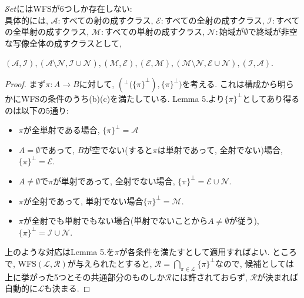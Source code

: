 \documentclass[. /main]{subfiles}
\begin{document}
\begin{momoprop}
$\mathcal{S}et$にはWFSが6つしか存在しない:\\
具体的には, $\mathcal{A}:$すべての射の成すクラス, $\mathcal{E}:$すべての全射の成すクラス, $\mathcal{I}:$すべての全単射の成すクラス, $\mathcal{M}:$すべての単射の成すクラス, $\mathcal{N}:$始域が$\emptyset$で終域が非空な写像全体の成すクラスとして, 
\begin{center} $(\mathcal{A},  \mathcal{I}),  (\mathcal{A} \setminus \mathcal{N},  \mathcal{I} \cup \mathcal{N}),  (\mathcal{M},  \mathcal{E}),  (\mathcal{E},  \mathcal{M}),  (\mathcal{M} \setminus \mathcal{N},  \mathcal{E} \cup \mathcal{N}),  (\mathcal{I},  \mathcal{A})$.
\end{center}
\end{momoprop}
\begin{proof}
まず$\pi \colon A \to B$に対して, $({{}^{\perp}(\{\pi\}}^{\perp}),  {\{\pi\}}^{\perp})$を考える. これは構成から明らかにWFSの条件のうち(b)(c)を満たしている. Lemma 5.より${\{\pi\}}^{\perp}$としてあり得るのは以下の5通り:
\begin{itemize}
\item $\pi$が全単射である場合, ${\{\pi\}}^{\perp}=\mathcal{A}$
\item $A=\emptyset$であって, $B$が空でない(すると$\pi$は単射であって, 全射でない)場合, ${\{\pi\}}^{\perp}=\mathcal{E}$. 
\item $A \neq \emptyset$で$\pi$が単射であって, 全射でない場合, ${\{\pi\}}^{\perp}=\mathcal{E} \cup \mathcal{N}$. 
\item $\pi$が全射であって, 単射でない場合${\{\pi\}}^{\perp}=\mathcal{M}$. 
\item $\pi$が全射でも単射でもない場合(単射でないことから$A \neq \emptyset$が従う), ${\{\pi\}}^{\perp}=\mathcal{I} \cup \mathcal{N}$. 
\end{itemize}
上のような対応はLemma 5.を$\pi$が各条件を満たすとして適用すればよい. ところで, WFS$(\mathcal{L},  \mathcal{R})$が与えられたとすると, $\mathcal{R}={\bigcap}_{\pi \in \mathcal{L}} {\{\pi\}}^{\perp}$なので, 候補としては上に挙がった5つとその共通部分のものしか$\mathcal{R}$には許されておらず, $\mathcal{R}$が決まれば自動的に$\mathcal{L}$も決まる. 


\end{proof}
\end{document}
